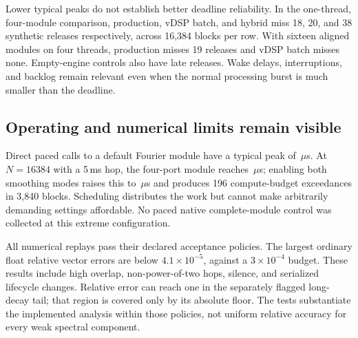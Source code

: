 Lower typical peaks do not establish better deadline reliability. In the
one-thread, four-module comparison, production, vDSP batch, and hybrid miss
18, 20, and 38 synthetic releases respectively, across 16,384 blocks per row.
With sixteen aligned modules on four threads, production misses 19 releases
and vDSP batch misses none. Empty-engine controls also have late releases.
Wake delays, interruptions, and backlog remain relevant even when the normal
processing burst is much smaller than the deadline.

\subsection{Operating and numerical limits remain visible}
Direct paced calls to a default Fourier module have a typical peak of
\StudyModuleDefaultPeak\,$\mu$s. At $N=16384$ with a 5\,ms hop, the
four-port module reaches \StudyModuleExtremePeak\,$\mu$s; enabling both
smoothing modes raises this to \StudyModuleBothPeak\,$\mu$s and produces
196 compute-budget exceedances in 3,840 blocks. Scheduling distributes the
work but cannot make arbitrarily demanding settings affordable. No paced
native complete-module control was collected at this extreme configuration.

All numerical replays pass their declared acceptance policies. The largest
ordinary float relative vector errors are below $4.1\times10^{-5}$, against
a $3\times10^{-4}$ budget. These results include high overlap,
non-power-of-two hops, silence, and serialized lifecycle changes. Relative
error can reach one in the separately flagged long-decay tail; that region
is covered only by its absolute floor. The tests substantiate the implemented
analysis within those policies, not uniform relative accuracy for every weak
spectral component.
